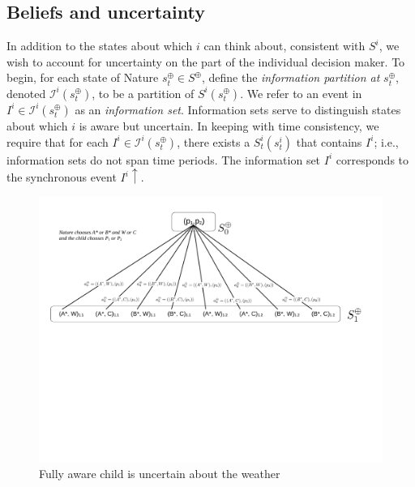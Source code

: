\documentclass[
11pt,
titlepage,
reqno,
]{article}%
\theoremstyle{definition}
\begin{document}
	
	\subsection{Beliefs and uncertainty}
	
	In addition to the states about which $i$ can think about, consistent with $S^i$, we wish to account for uncertainty on the part of the individual decision maker. 
	To begin, for each state of Nature $s^\oplus_t\in S^\oplus$, define the\textit{ information partition at} $s^\oplus_t$, denoted $\mathcal{I}^i(s^\oplus_t)$,  to be a partition of $S^i(s^\oplus_t)$. 
	We refer to an event in $I^i\in\mathcal{I}^i(s^\oplus_t)$ as an \textit{information set}. 
	Information sets serve to distinguish states about which 	$i$ is aware but uncertain. 
	In keeping with time consistency, we require that for each $I^i\in\mathcal{I}^i(s^\oplus_t)$, there exists a $S^i_t(s^i_t)$ that contains $I^i$; i.e., information sets do not span time periods.  
	The information set $I^i$ corresponds to the synchronous event $I^i\uparrow$.
	
	\begin{figure}[h!]
		\centering
		\includegraphics*[page=5,trim = 0in 3.5in .8in 0in,scale=.6]{Awareness_Diagrams_All}
		\caption{Fully aware child is uncertain about the weather\label{Diag: p-05}}%
	\end{figure}
	
\end{document}
